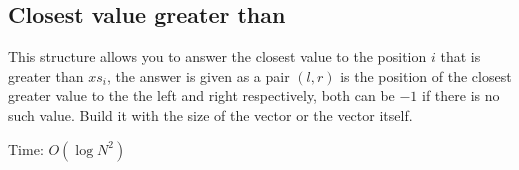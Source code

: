 \subsection{Closest value greater than}

This structure allows you to answer the closest value to the position $i$ that is greater than $xs_i$, the answer is given as a pair $(l,r)$ is the position of the closest greater value to the the left and right respectively, both can be $-1$ if there is no such value. Build it with the size of the vector or the vector itself.

Time: $O(\log{N}^{2})$

